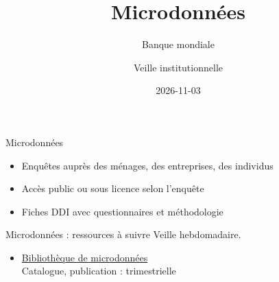 \documentclass[aspectratio=169,11pt]{beamer}
\title{Microdonnées}
\subtitle{Banque mondiale}
\author{Veille institutionnelle}
\date{2026-11-03}
\begin{document}
\begin{frame}\titlepage\end{frame}

\begin{frame}{Microdonnées}
\begin{itemize}
\item Enquêtes auprès des ménages, des entreprises, des individus
\item Accès public ou sous licence selon l'enquête
\item Fiches DDI avec questionnaires et méthodologie
\end{itemize}
\end{frame}

\begin{frame}{Microdonnées : ressources à suivre}
\small
Veille hebdomadaire.
\begin{itemize}
\item \href{https://microdata.worldbank.org}{Bibliothèque de microdonnées}\\{\footnotesize Catalogue, publication : trimestrielle}
\end{itemize}
\end{frame}
\end{document}
